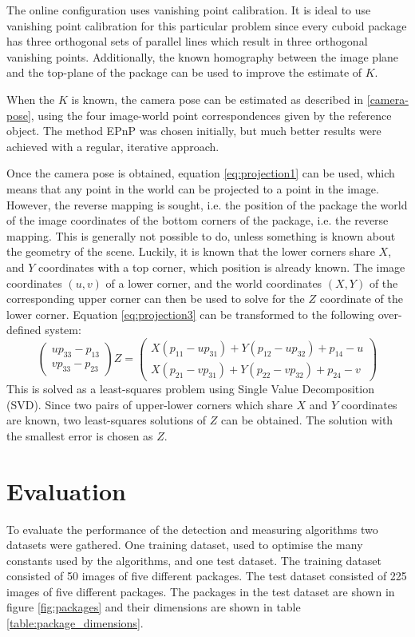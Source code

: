 The online configuration uses vanishing point calibration.
It is ideal to use vanishing point calibration for this particular problem since every cuboid package has three orthogonal sets of parallel lines which result in three orthogonal vanishing points.
Additionally, the known homography between the image plane and the top-plane of the package can be used to improve the estimate of $K$.

When the $K$ is known, the camera pose can be estimated as described in \ref{camera-pose}, using the four image-world point correspondences given by the reference object.
The method EPnP was chosen initially, but much better results were achieved with a regular, iterative approach. %

Once the camera pose is obtained, equation \ref{eq:projection1} can be used, which means that any point in the world can be projected to a point in the image.
However, the reverse mapping is sought, i.e. the position of the package the world of the image coordinates of the bottom corners of the package, i.e. the reverse mapping.
This is generally not possible to do, unless something is known about the geometry of the scene.
Luckily, it is known that the lower corners share $X$, and $Y$ coordinates with a top corner, which position is already known.
The image coordinates $(u,v)$ of a lower corner, and the world coordinates $(X,Y)$ of the corresponding upper corner can then be used to solve for the $Z$ coordinate of the lower corner. 
Equation \ref{eq:projection3} can be transformed to the following over-defined system:
\begin{equation} \label{eq:constrained-projection}
\begin{pmatrix} up_{33}-p_{13} \\ vp_{33}-p_{23} \end{pmatrix} Z = 
\begin{pmatrix}
X(p_{11}-up_{31}) + Y(p_{12}-up_{32})+p_{14}-u \\
X(p_{21}-vp_{31}) + Y(p_{22}-vp_{32})+p_{24}-v
\end{pmatrix}
\end{equation}
This is solved as a least-squares problem using Single Value Decomposition (SVD).
Since two pairs of upper-lower corners which share $X$ and $Y$ coordinates are known, two least-squares solutions of $Z$ can be obtained.
The solution with the smallest error is chosen as $Z$.

\section{Evaluation}
To evaluate the performance of the detection and measuring algorithms two datasets were gathered.
One training dataset, used to optimise the many constants used by the algorithms, and one test dataset. %
The training dataset consisted of 50 images of five different packages.
The test dataset consisted of 225 images of five different packages.
The packages in the test dataset are shown in figure \ref{fig:packages} and their dimensions are shown in table \ref{table:package_dimensions}.

